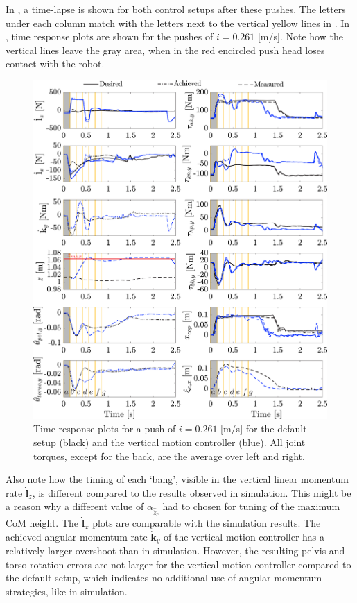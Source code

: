 In , a time-lapse is shown for both control setups after these pushes. The letters under each column match with the letters next to the vertical yellow lines in . In , time response plots are shown for the pushes of $i=0.261$ [m/s]. Note how the vertical lines leave the gray area, when in  the red encircled push head loses contact with the robot. 
\begin{figure}
\centering
\includegraphics[width=1.0\textwidth]{STYLESTUFF/valcomparetimeHW.png}
\caption{Time response plots for a push of $i=0.261$ [m/s] for the default setup (black) and the vertical motion controller (blue). All joint torques, except for the back, are the average over left and right.}
\label{fig:valcomparetimeHW}
\end{figure}

Also note how the timing of each `bang', visible in the vertical linear momentum rate $\dot{\mathbf{l}}_z$, is different compared to the results observed in simulation. This might be a reason why a different value of $\alpha_{\hat{\ddot{z}}_{c}}$ had to chosen for tuning of the maximum \ac{CoM} height. The $\dot{\mathbf{l}}_x$ plots are comparable with the simulation results. The achieved angular momentum rate $\dot{\mathbf{k}}_y$ of the vertical motion controller has a relatively larger overshoot than in simulation. However, the resulting pelvis and torso rotation errors are not larger for the vertical motion controller compared to the default setup, which indicates no additional use of angular momentum strategies, like in simulation. 

